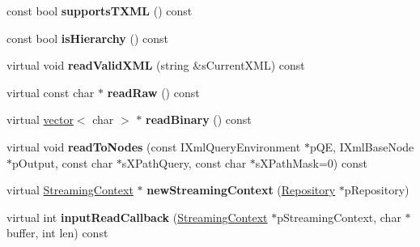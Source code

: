 \begin{DoxyCompactItemize}
\item 
\hypertarget{classgeneral__server_1_1Repository_a91f45b79938e3b6ed9746759169aa5a5}{const bool {\bfseries supports\-T\-X\-M\-L} () const }\label{classgeneral__server_1_1Repository_a91f45b79938e3b6ed9746759169aa5a5}

\item 
\hypertarget{classgeneral__server_1_1Repository_a296405e2e5a6b95287f46a6060ff5fc9}{const bool {\bfseries is\-Hierarchy} () const }\label{classgeneral__server_1_1Repository_a296405e2e5a6b95287f46a6060ff5fc9}

\item 
\hypertarget{classgeneral__server_1_1Repository_a6da2f40a2dbf71c1aea99490b904aded}{virtual void {\bfseries read\-Valid\-X\-M\-L} (string \&s\-Current\-X\-M\-L) const }\label{classgeneral__server_1_1Repository_a6da2f40a2dbf71c1aea99490b904aded}

\item 
\hypertarget{classgeneral__server_1_1Repository_a2c88512b63e5bf62d94b942ec7a03da6}{virtual const char $\ast$ {\bfseries read\-Raw} () const }\label{classgeneral__server_1_1Repository_a2c88512b63e5bf62d94b942ec7a03da6}

\item 
\hypertarget{classgeneral__server_1_1Repository_a2f2cca94246ffb23b66db3822ab89ec9}{virtual \hyperlink{classvector}{vector}$<$ char $>$ $\ast$ {\bfseries read\-Binary} () const }\label{classgeneral__server_1_1Repository_a2f2cca94246ffb23b66db3822ab89ec9}

\item 
\hypertarget{classgeneral__server_1_1Repository_aeee475cf147943c91091b65b4089834b}{virtual void {\bfseries read\-To\-Nodes} (const \-I\-Xml\-Query\-Environment $\ast$p\-Q\-E, \-I\-Xml\-Base\-Node $\ast$p\-Output, const char $\ast$s\-X\-Path\-Query, const char $\ast$s\-X\-Path\-Mask=0) const }\label{classgeneral__server_1_1Repository_aeee475cf147943c91091b65b4089834b}

\item 
\hypertarget{classgeneral__server_1_1Repository_a43549bca8e4ab3374d722a65092adf5e}{virtual \hyperlink{classgeneral__server_1_1Repository_1_1StreamingContext}{\-Streaming\-Context} $\ast$ {\bfseries new\-Streaming\-Context} (\hyperlink{classgeneral__server_1_1Repository}{\-Repository} $\ast$p\-Repository)}\label{classgeneral__server_1_1Repository_a43549bca8e4ab3374d722a65092adf5e}

\item 
\hypertarget{classgeneral__server_1_1Repository_a568aa5178136d15d9b9cddff2bbae423}{virtual int {\bfseries input\-Read\-Callback} (\hyperlink{classgeneral__server_1_1Repository_1_1StreamingContext}{\-Streaming\-Context} $\ast$p\-Streaming\-Context, char $\ast$buffer, int len) const }\label{classgeneral__server_1_1Repository_a568aa5178136d15d9b9cddff2bbae423}


\end{DoxyCompactItemize}
